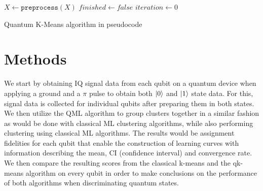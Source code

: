 \documentclass[conference]{IEEEtran}
\begin{document}
\begin{algorithm}[ht]
\DontPrintSemicolon
\SetAlgoLined
{}
    $X\longleftarrow \texttt{preprocess}(X)$\;
    $finished\longleftarrow false$\;
    $iteration\longleftarrow 0$\;
 \caption{Quantum K-Means algorithm in pseudocode}
 \label{alg:qkmeans}
\end{algorithm}

\section{Methods}

We start by obtaining IQ signal data from each qubit on a quantum device when applying a ground and a \(\pi\) pulse to obtain both \(\ket{0}\) and \(\ket{1}\) state data. For this, signal data is collected for individual qubits after preparing them in both states. We then utilize the QML algorithm to group clusters together in a similar fashion as would be done with classical ML clustering algorithms, while also performing clustering using classical ML algorithms. The results would be assignment fidelities for each qubit that enable the construction of learning curves with information describing the mean, CI (confidence interval) and convergence rate. We then compare the resulting scores from the classical k-means and the qk-means algorithm on every qubit in order to make conclusions on the performance of both algorithms when discriminating quantum states.
\end{document}

